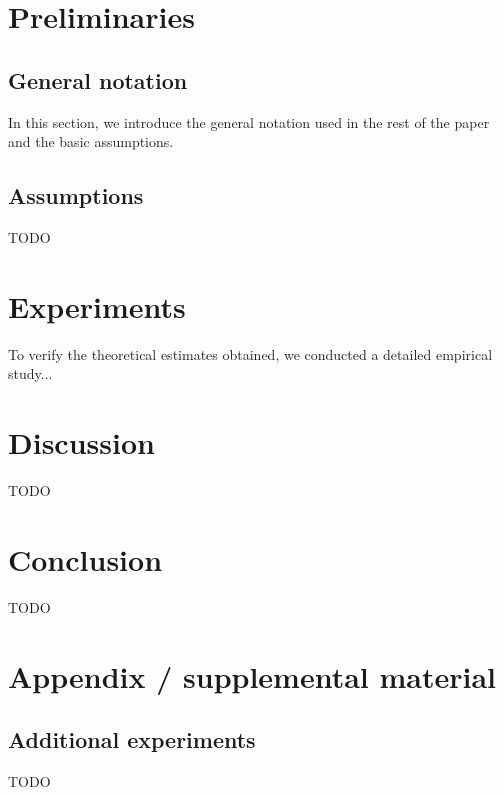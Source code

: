 \documentclass{article}
\begin{document}
\section{Preliminaries}\label{sec:prelim}

\subsection{General notation}

In this section, we introduce the general notation used in the rest of the paper and the basic assumptions. 

\subsection{Assumptions} 

TODO

\section{Experiments}\label{sec:exp}

To verify the theoretical estimates obtained, we conducted a detailed empirical study...

\section{Discussion}\label{sec:disc}

TODO

\section{Conclusion}\label{sec:concl}

TODO







\newpage
\appendix
\section{Appendix / supplemental material}\label{app}

\subsection{Additional experiments}\label{app:exp}

TODO
\end{document}

